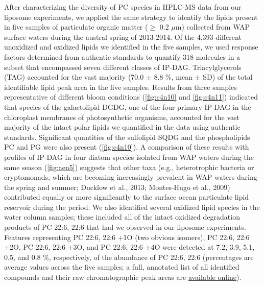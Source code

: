 After characterizing the diversity of PC species in HPLC-MS data from our liposome experiments, we applied the same strategy to identify the lipids present in five samples of particulate organic matter ($\geq$ 0.2 $\mu$m) collected from WAP surface waters during the austral spring of 2013-2014. Of the 4,393 different unoxidized and oxidized lipids we identified in the five samples, we used response factors determined from authentic standards to quantify 318 molecules in a subset that encompassed seven different classes of IP-DAG. Triacylglycerols (TAG) accounted for the vast majority (70.0 $\pm$ 8.8 \%, mean $\pm$ SD) of the total identifiable lipid peak area in the five samples. Results from three samples representative of different bloom conditions (\autoref{fig:c4n10} and \autoref{fig:c4n11}) indicated that species of the galactolipid DGDG, one of the four primary IP-DAG in the chloroplast membranes of photosynthetic organisms, accounted for the vast majority of the intact polar lipids we quantified in the data using authentic standards. Significant quantities of the sulfolipid SQDG and the phospholipids PC and PG were also present (\autoref{fig:c4n10}). A comparison of these results with profiles of IP-DAG in four diatom species isolated from WAP waters during the same season (\autoref{fig:aen5}) suggests that other taxa (e.g., heterotrophic bacteria or cryptomonads, which are becoming increasingly prevalent in WAP waters during the spring and summer; Ducklow et al., 2013; Montes-Hugo et al., 2009) contributed equally or more significantly to the surface ocean particulate lipid reservoir during the period. We also identified several oxidized lipid species in the water column samples; these included all of the intact oxidized degradation products of PC 22:6, 22:6 that had we observed in our liposome experiments. Features representing PC 22:6, 22:6 +1O (two obvious isomers), PC 22:6, 22:6 +2O, PC 22:6, 22:6 +3O, and PC 22:6, 22:6 +4O were detected at 7.2, 3.9, 5.1, 0.5, and 0.8 \%, respectively, of the abundance of PC 22:6, 22:6 (percentages are average values across the five samples; a full, annotated list of all identified compounds and their raw chromatographic peak areas are \href{https://github.com/jamesrco/LipidPhotoOxBox/tree/master/data/nice/LOBSTAHS_lipid_identities}{available online}).
